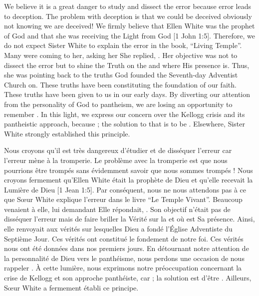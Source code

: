 We believe it is a great danger to study and dissect the error because error leads to deception. The problem with deception is that we could be deceived obviously not knowing we are deceived! We firmly believe that Ellen White was the prophet of God and that she was receiving the Light from God [1 John 1:5]. Therefore, we do not expect Sister White to explain the error in the book, “Living Temple”. Many were coming to her, asking her  She replied, . Her objective was not to dissect the error but to shine the Truth on the  and where His presence is. Thus, she was pointing back to the truths God founded the Seventh-day Adventist Church on. These truths have been constituting the foundation of our faith. These truths have been given to us in our early days. By diverting our attention from the personality of God to pantheism, we are losing an opportunity to remember . In this light, we express our concern over the Kellogg crisis and its pantheistic approach, because ; the solution to that is to be . Elsewhere, Sister White strongly established this principle.


Nous croyons qu'il est très dangereux d'étudier et de disséquer l'erreur car l'erreur mène à la tromperie. Le problème avec la tromperie est que nous pourrions être trompés sans évidemment savoir que nous sommes trompés ! Nous croyons fermement qu'Ellen White était la prophète de Dieu et qu'elle recevait la Lumière de Dieu [1 Jean 1:5]. Par conséquent, nous ne nous attendons pas à ce que Sœur White explique l'erreur dans le livre “Le Temple Vivant”. Beaucoup venaient à elle, lui demandant  Elle répondait, . Son objectif n'était pas de disséquer l'erreur mais de faire briller la Vérité sur la  et où est Sa présence. Ainsi, elle renvoyait aux vérités sur lesquelles Dieu a fondé l'Église Adventiste du Septième Jour. Ces vérités ont constitué le fondement de notre foi. Ces vérités nous ont été données dans nos premiers jours. En détournant notre attention de la personnalité de Dieu vers le panthéisme, nous perdons une occasion de nous rappeler . À cette lumière, nous exprimons notre préoccupation concernant la crise de Kellogg et son approche panthéiste, car  ; la solution est d'être . Ailleurs, Sœur White a fermement établi ce principe.



